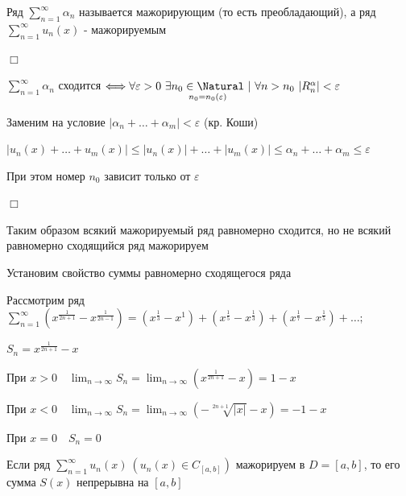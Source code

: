 \documentclass[12pt]{article}
\begin{document}
    \Nota Ряд $\sum_{n = 1}^\infty \alpha_n$ называется мажорирующим (то есть преобладающий), 
    а ряд $\sum_{n = 1}^\infty u_n(x)$ - мажорируемым

    \begin{MyProof}
        $\Box$

        $\sum_{n = 1}^\infty \alpha_n$ сходится $\Longleftrightarrow \forall \varepsilon > 0 \ \exists \underset{n_0 = n_0(\varepsilon)}{n_0 \in \Natural} \ | \
        \forall n > n_0 \ |R_n^\alpha| < \varepsilon$

        Заменим на условие $|\alpha_n + \dots + \alpha_m| < \varepsilon$ (кр. Коши)

        $|u_n(x) + \dots + u_m(x)| \leq |u_n(x)| + \dots + |u_m(x)| \leq \alpha_n + \dots + \alpha_m \leq \varepsilon$

        При этом номер $n_0$ зависит только от $\varepsilon$

        $\Box$
    \end{MyProof}

    \Nota Таким образом всякий мажорируемый ряд равномерно сходится, но не всякий равномерно сходящийся ряд мажорируем

    \Nota Установим свойство суммы равномерно сходящегося ряда

    \Exs Рассмотрим ряд $\sum_{n = 1}^\infty (x^{\frac{1}{2n + 1}} - x^{\frac{1}{2n - 1}}) = (x^\frac{1}{3} - x^1) + (x^\frac{1}{5} - x^\frac{1}{3}) + (x^\frac{1}{7} - x^\frac{1}{5}) + \dots;$

    $S_n = x^\frac{1}{2n + 1} - x$

    При $x > 0 \quad \lim_{n \to \infty} S_n = \lim_{n \to \infty} (x^\frac{1}{2n + 1} - x) = 1 - x$

    При $x < 0 \quad \lim_{n \to \infty} S_n = \lim_{n \to \infty} (-\sqrt[2n + 1]{|x|} - x) = -1 - x$

    При $x = 0 \quad S_n = 0$


    \hypertarget{functionalsumcontinuity}{}

    \begin{MyTheorem}
        \Ths Если ряд $\sum_{n = 1}^\infty u_n(x) \ (u_n(x) \in C_{[a, b]})$ мажорируем в $D = [a, b]$, то 
        его сумма $S(x)$ непрерывна на $[a, b]$
    \end{MyTheorem}
\end{document}
